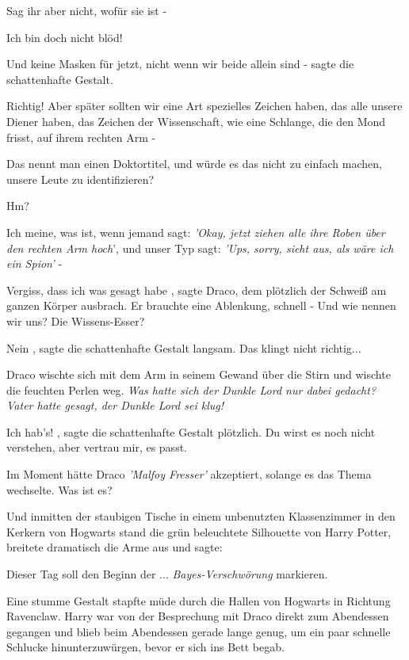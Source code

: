 \glqq Sag ihr aber nicht, wofür sie ist -\grqq{}

\glqq Ich bin doch nicht blöd!\grqq{}

\glqq Und keine Masken für jetzt, nicht wenn wir beide allein sind -\grqq{}
sagte die schattenhafte Gestalt.

\glqq Richtig! Aber später sollten wir eine Art spezielles Zeichen haben, das
alle unsere Diener haben, das Zeichen der Wissenschaft, wie eine Schlange, die
den Mond frisst, auf ihrem rechten Arm -\grqq{}

\glqq Das nennt man einen Doktortitel, und würde es das nicht zu einfach machen,
unsere Leute zu identifizieren?\grqq{}

\glqq Hm?\grqq{}

\glqq Ich meine, was ist, wenn jemand sagt: \emph{'Okay, jetzt ziehen alle ihre
Roben über den rechten Arm hoch}', und unser Typ sagt: \emph{'Ups, sorry, sieht
aus, als wäre ich ein Spion'} -\grqq{}

\glqq Vergiss, dass ich was gesagt habe\grqq{} , sagte Draco, dem plötzlich der
Schweiß am ganzen Körper ausbrach. Er brauchte eine Ablenkung, schnell - \glqq
Und wie nennen wir uns? Die Wissens-Esser?\grqq{}

\glqq Nein\grqq{} , sagte die schattenhafte Gestalt langsam. \glqq Das klingt
nicht richtig...\grqq{}

Draco wischte sich mit dem Arm in seinem Gewand über die Stirn und wischte die
feuchten Perlen weg. \emph{Was hatte sich der Dunkle Lord nur dabei gedacht?
Vater hatte gesagt, der Dunkle Lord sei klug!}

\glqq Ich hab's!\grqq{} , sagte die schattenhafte Gestalt plötzlich. \glqq Du
wirst es noch nicht verstehen, aber vertrau mir, es passt.\grqq{}

Im Moment hätte Draco \emph{'Malfoy Fresser' }akzeptiert, solange es das Thema
wechselte. \glqq Was ist es?\grqq{}

Und inmitten der staubigen Tische in einem unbenutzten Klassenzimmer in den
Kerkern von Hogwarts stand die grün beleuchtete Silhouette von Harry Potter,
breitete dramatisch die Arme aus und sagte:

\glqq Dieser Tag soll den Beginn der ...\emph{ Bayes-Verschwörung}
markieren.\grqq{}

Eine stumme Gestalt stapfte müde durch die Hallen von Hogwarts in Richtung
Ravenclaw. Harry war von der Besprechung mit Draco direkt zum Abendessen
gegangen und blieb beim Abendessen gerade lange genug, um ein paar schnelle
Schlucke hinunterzuwürgen, bevor er sich ins Bett begab.

